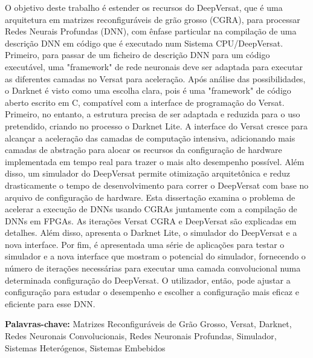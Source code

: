 O objetivo deste trabalho é estender os recursos do DeepVersat, que é uma arquitetura em matrizes reconfiguráveis de grão grosso (CGRA), para
processar Redes Neurais Profundas (DNN), com ênfase particular na compilação de uma descrição DNN em código que é executado num
Sistema CPU/DeepVersat.
Primeiro, para passar de um ficheiro de descrição DNN para um código executável, uma "framework" de rede neuronais deve ser adaptada para executar as diferentes camadas
no Versat para aceleração. Após análise das possibilidades, o Darknet é visto como uma escolha clara, pois é uma "framework" de código aberto escrito em C, compatível
com a interface de programação do Versat. Primeiro, no entanto, a estrutura precisa de ser adaptada e reduzida para o uso pretendido, criando no processo o Darknet Lite.
A interface do Versat cresce para alcançar a aceleração das camadas de computação intensiva, adicionando mais camadas de abstração para alocar os recursos
da configuração de hardware implementada em tempo real para trazer o mais alto desempenho possível. Além disso, um simulador do DeepVersat permite otimização arquitetônica e reduz drasticamente o tempo de desenvolvimento
para correr o DeepVersat com base no arquivo de configuração de hardware.
Esta dissertação examina o problema de acelerar a execução de DNNs usando CGRAs juntamente com a compilação de DNNs em FPGAs. As iterações Versat CGRA e DeepVersat são explicadas em detalhes.
Além disso, apresenta o Darknet Lite, o simulador do DeepVersat e a nova interface. Por fim, é apresentada uma série de aplicações para testar o simulador e a nova interface que mostram o potencial
do simulador, fornecendo o número de iterações necessárias para executar uma camada convolucional numa determinada configuração do DeepVersat. O utilizador, então, pode ajustar a configuração para estudar o desempenho
e escolher a configuração mais eficaz e eficiente para esse DNN.


\vfill

\textbf{\Large Palavras-chave:} Matrizes Reconfiguráveis de Grão Grosso, Versat, Darknet, Redes Neuronais Convolucionais, Redes Neuronais Profundas, Simulador, Sistemas Heterógenos, Sistemas Embebidos

